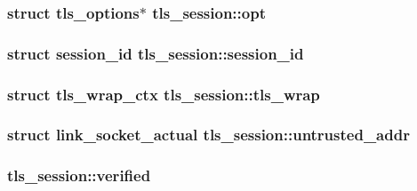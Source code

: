 \subsubsection[{opt}]{\setlength{\rightskip}{0pt plus 5cm}struct {\bf tls\+\_\+options}$\ast$ tls\+\_\+session\+::opt}\label{structtls__session_a748abaa327fa0bd6a8c23224a06f3a56}
\hypertarget{structtls__session_af71f7593007875222fc1bfbeeaf5d4fc}{}
\subsubsection[{session\+\_\+id}]{\setlength{\rightskip}{0pt plus 5cm}struct {\bf session\+\_\+id} tls\+\_\+session\+::session\+\_\+id}\label{structtls__session_af71f7593007875222fc1bfbeeaf5d4fc}
\hypertarget{structtls__session_a8c6ee7b38824295f77feaeb35ac8e673}{}
\subsubsection[{tls\+\_\+wrap}]{\setlength{\rightskip}{0pt plus 5cm}struct {\bf tls\+\_\+wrap\+\_\+ctx} tls\+\_\+session\+::tls\+\_\+wrap}\label{structtls__session_a8c6ee7b38824295f77feaeb35ac8e673}
\hypertarget{structtls__session_aa9bbd0222f1023fa627bc6736cc9135c}{}
\subsubsection[{untrusted\+\_\+addr}]{\setlength{\rightskip}{0pt plus 5cm}struct {\bf link\+\_\+socket\+\_\+actual} tls\+\_\+session\+::untrusted\+\_\+addr}\label{structtls__session_aa9bbd0222f1023fa627bc6736cc9135c}
\hypertarget{structtls__session_a5409c3f4b00fb0bbea119d3431f3ec8f}{}
\subsubsection[{verified}]{ tls\+\_\+session\+::verified}\label{structtls__session_a5409c3f4b00fb0bbea119d3431f3ec8f}
\hypertarget{structtls__session_a9b8993f2c4525caa43cb88b00a20bada}{}
